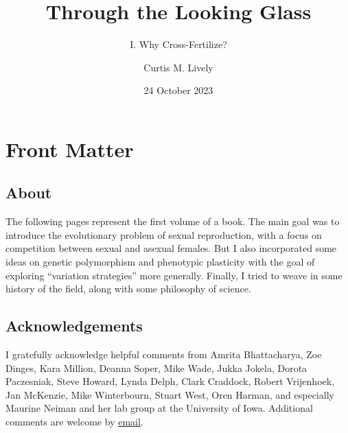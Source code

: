 \documentclass[
  letterpaper,
]{book}
\title{Through the Looking Glass}
\subtitle{I. Why Cross-Fertilize?}
\author{Curtis M. Lively}
\date{24 October 2023}
\renewcommand*\contentsname{Table of contents}
\newcommand\contentsname{Table of contents}
\begin{document}
\frontmatter
\maketitle
\ifdefined\Shaded\renewenvironment{Shaded}{\begin{tcolorbox}[sharp corners, interior hidden, boxrule=0pt, borderline west={3pt}{0pt}{shadecolor}, breakable, frame hidden, enhanced]}{\end{tcolorbox}}\fi

\renewcommand*\contentsname{Contents}
{
\hypersetup{linkcolor=}
\setcounter{tocdepth}{2}
\tableofcontents
}
\listoffigures
\listoftables
\mainmatter
{}

\hypertarget{front-matter}{%
\chapter*{Front Matter}\label{front-matter}}


\hypertarget{about}{%
\section*{About}\label{about}}


The following pages represent the first volume of a book. The main goal
was to introduce the evolutionary problem of sexual reproduction, with a
focus on competition between sexual and asexual females. But I also
incorporated some ideas on genetic polymorphism and phenotypic
plasticity with the goal of exploring ``variation strategies'' more
generally. Finally, I tried to weave in some history of the field, along
with some philosophy of science.

\hypertarget{acknowledgements}{%
\section*{Acknowledgements}\label{acknowledgements}}


I gratefully acknowledge helpful comments from Amrita Bhattacharya, Zoe
Dinges, Kara Million, Deanna Soper, Mike Wade, Jukka Jokela, Dorota
Paczesniak, Steve Howard, Lynda Delph, Clark Craddock, Robert
Vrijenhoek, Jan McKenzie, Mike Winterbourn, Stuart West, Oren Harman,
and especially Maurine Neiman and her lab group at the University of
Iowa. Additional comments are welcome by
\href{mailto:clively@indiana.edu}{email}.
\end{document}
